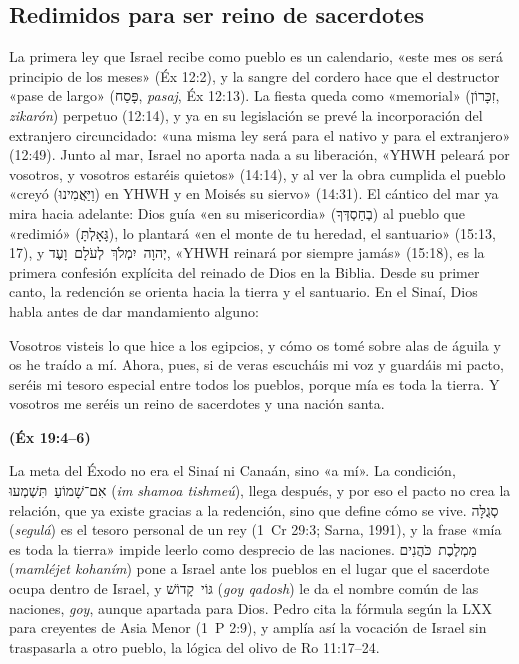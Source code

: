 \documentclass[11pt,letterpaper]{article}
\newcommand{\heb}[1]{\mbox{\foreignlanguage{hebrew}{#1}}}
\newcommand{\fuente}[1]{\par\hfill{\upshape\bfseries\small\textcolor{ladrillo}{#1}}}
\begin{document}
\subsection{Redimidos para ser reino de sacerdotes}
La primera ley que Israel recibe como pueblo es un calendario, «este mes os será principio de los meses» (Éx 12:2), y la sangre del cordero hace que el destructor «pase de largo» (\heb{פָּסַח}, \emph{pasaj}, Éx 12:13). La fiesta queda como «memorial» (\heb{זִכָּרוֹן}, \emph{zikarón}) perpetuo (12:14), y ya en su legislación se prevé la incorporación del extranjero circuncidado: «una misma ley será para el nativo y para el extranjero» (12:49). Junto al mar, Israel no aporta nada a su liberación, «YHWH peleará por vosotros, y vosotros estaréis quietos» (14:14), y al ver la obra cumplida el pueblo «creyó (\heb{וַיַּאֲמִינוּ}) en YHWH y en Moisés su siervo» (14:31). El cántico del mar ya mira hacia adelante: Dios guía «en su misericordia» (\heb{בְחַסְדְּךָ}) al pueblo que «redimió» (\heb{גָּאָלְתָּ}), lo plantará «en el monte de tu heredad, el santuario» (15:13, 17), y \heb{יְהוָה יִמְלֹךְ לְעֹלָם וָעֶד}, «YHWH reinará por siempre jamás» (15:18), es la primera confesión explícita del reinado de Dios en la Biblia. Desde su primer canto, la redención se orienta hacia la tierra y el santuario. En el Sinaí, Dios habla antes de dar mandamiento alguno:

\begin{cita}Vosotros visteis lo que hice a los egipcios, y cómo os tomé sobre alas de águila y os he traído a mí. Ahora, pues, si de veras escucháis mi voz y guardáis mi pacto, seréis mi tesoro especial entre todos los pueblos, porque mía es toda la tierra. Y vosotros me seréis un reino de sacerdotes y una nación santa.\fuente{(Éx 19:4--6)}\end{cita}

La meta del Éxodo no era el Sinaí ni Canaán, sino «a mí». La condición, \heb{אִם־שָׁמוֹעַ תִּשְׁמְעוּ} (\emph{im shamoa tishmeú}), llega después, y por eso el pacto no crea la relación, que ya existe gracias a la redención, sino que define cómo se vive. \heb{סְגֻלָּה} (\emph{segulá}) es el tesoro personal de un rey (1~Cr 29:3; Sarna, 1991), y la frase «mía es toda la tierra» impide leerlo como desprecio de las naciones. \heb{מַמְלֶכֶת כֹּהֲנִים} (\emph{mamléjet kohaním}) pone a Israel ante los pueblos en el lugar que el sacerdote ocupa dentro de Israel, y \heb{גּוֹי קָדוֹשׁ} (\emph{goy qadosh}) le da el nombre común de las naciones, \emph{goy}, aunque apartada para Dios. Pedro cita la fórmula según la LXX para creyentes de Asia Menor (1~P 2:9), y amplía así la vocación de Israel sin traspasarla a otro pueblo, la lógica del olivo de Ro 11:17–24.
\end{document}
